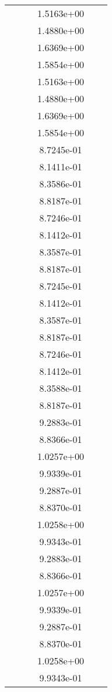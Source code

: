 \begin{xltabular}{\textwidth}{r|rS[table-format=1.3e+2]S[table-format=1.4e+2]S[table-format=1.4e+2]S[table-format=-1.5]}
&  &  & 1.5163e+00 & & \\
&  &  & 1.4880e+00 & & \\
&  &  & 1.6369e+00 & & \\
&  &  & 1.5854e+00 & & \\
&  &  & 1.5163e+00 & & \\
&  &  & 1.4880e+00 & & \\
&  &  & 1.6369e+00 & & \\
&  &  & 1.5854e+00 & & \\
&  &  & 8.7245e-01 & & \\
&  &  & 8.1411e-01 & & \\
&  &  & 8.3586e-01 & & \\
&  &  & 8.8187e-01 & & \\
&  &  & 8.7246e-01 & & \\
&  &  & 8.1412e-01 & & \\
&  &  & 8.3587e-01 & & \\
&  &  & 8.8187e-01 & & \\
&  &  & 8.7245e-01 & & \\
&  &  & 8.1412e-01 & & \\
&  &  & 8.3587e-01 & & \\
&  &  & 8.8187e-01 & & \\
&  &  & 8.7246e-01 & & \\
&  &  & 8.1412e-01 & & \\
&  &  & 8.3588e-01 & & \\
&  &  & 8.8187e-01 & & \\
&  &  & 9.2883e-01 & & \\
&  &  & 8.8366e-01 & & \\
&  &  & 1.0257e+00 & & \\
&  &  & 9.9339e-01 & & \\
&  &  & 9.2887e-01 & & \\
&  &  & 8.8370e-01 & & \\
&  &  & 1.0258e+00 & & \\
&  &  & 9.9343e-01 & & \\
&  &  & 9.2883e-01 & & \\
&  &  & 8.8366e-01 & & \\
&  &  & 1.0257e+00 & & \\
&  &  & 9.9339e-01 & & \\
&  &  & 9.2887e-01 & & \\
&  &  & 8.8370e-01 & & \\
&  &  & 1.0258e+00 & & \\
&  &  & 9.9343e-01 & & \\

\end{xltabular}
